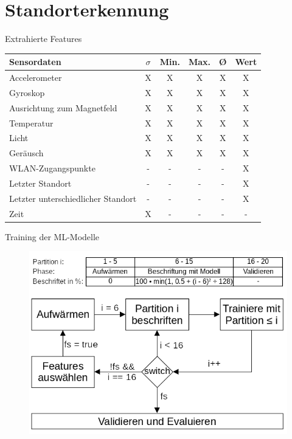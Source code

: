 \documentclass[10pt]{beamer}
\begin{document}
\section{Standorterkennung}
\begin{frame}{Extrahierte Features}
    \begin{table}
        \centering
        \begin{tabular}{ | l | c | c | c | c | c | }
            \hline
            Sensordaten & $\sigma$ & Min. & Max. & Ø & Wert \\\hline
            Accelerometer & X & X & X & X & X \\\hline
            Gyroskop & X & X & X & X & X \\\hline
            Ausrichtung zum Magnetfeld & X & X & X & X & X \\\hline
            Temperatur & X & X & X & X & X \\\hline
            Licht & X & X & X & X & X \\\hline
            Geräusch & X & X & X & X & X \\\hline
            WLAN-Zugangspunkte & - & - & - & - & X \\\hline
            Letzter Standort & - & - & - & - & X \\\hline
            Letzter unterschiedlicher Standort & - & - & - & - & X \\\hline
            Zeit & X & - & - & - & - \\\hline
        \end{tabular}
    \end{table}
\end{frame}

\begin{frame}{Training der ML-Modelle}
    \begin{figure}
        \centering
        \includegraphics[width=\linewidth]{model/training_explained.png}
    \end{figure}
\end{frame}
\end{document}
